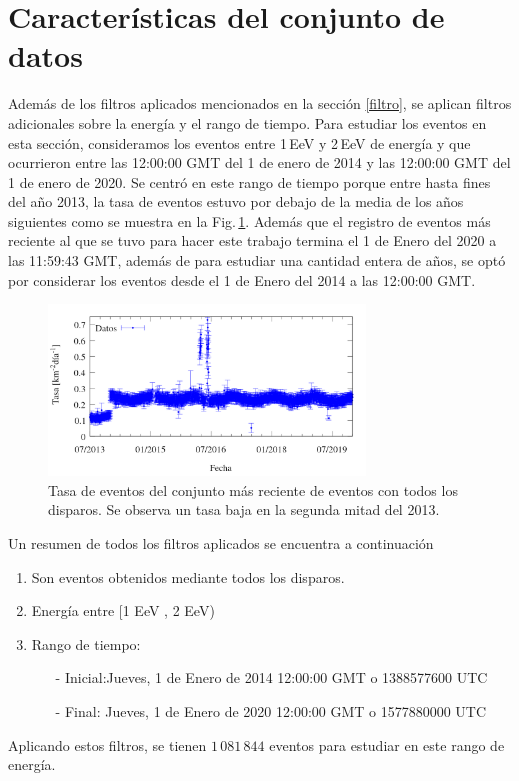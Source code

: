 \section{Características del conjunto de datos} \label{specs}

	Además de los filtros aplicados mencionados en la sección \ref{filtro}, se aplican filtros adicionales sobre la energía y el rango de tiempo. Para estudiar los eventos en esta sección, consideramos los eventos entre 1\,EeV y 2\,EeV de energía y que ocurrieron entre las 12:00:00 GMT del 1 de enero de 2014 y las 12:00:00 GMT del 1 de enero de 2020. Se centró en este rango de tiempo porque entre hasta fines del año 2013, la tasa de eventos estuvo por debajo de la media de los años siguientes como se muestra en la Fig.\,\ref{fig:rate_2020_AllTriggers}. Además que el registro de eventos más reciente al que se tuvo para hacer este trabajo termina el 1 de Enero del 2020  a las 11:59:43 GMT, además de para estudiar una cantidad entera de años, se optó por considerar los eventos desde el 1 de Enero del 2014 a las 12:00:00 GMT.

    \begin{figure}[H]
    	\centering
    	\includegraphics[width=0.75\textwidth]{rate_eventos_seleccion_rango.png}
    	\caption{Tasa de eventos del conjunto más reciente de eventos con todos los disparos. Se observa un tasa baja en la segunda mitad del 2013.}
    	\label{fig:rate_2020_AllTriggers}
    \end{figure}

	Un resumen de todos los filtros aplicados se encuentra a continuación
		\begin{enumerate}
			\item Son eventos obtenidos mediante todos los disparos.
			\item Energía entre  [1 EeV , 2 EeV)
			\item Rango de tiempo:
			\begin{itemize}
				\item[-] Inicial:Jueves, 1 de Enero de 2014 12:00:00 GMT o 1388577600 UTC
				\item[-] Final:  Jueves, 1 de Enero de 2020 12:00:00 GMT o 1577880000 UTC
			\end{itemize}

		\end{enumerate}
	Aplicando estos filtros, se tienen $1\,081\,844$ eventos para estudiar en este rango de energía. 

